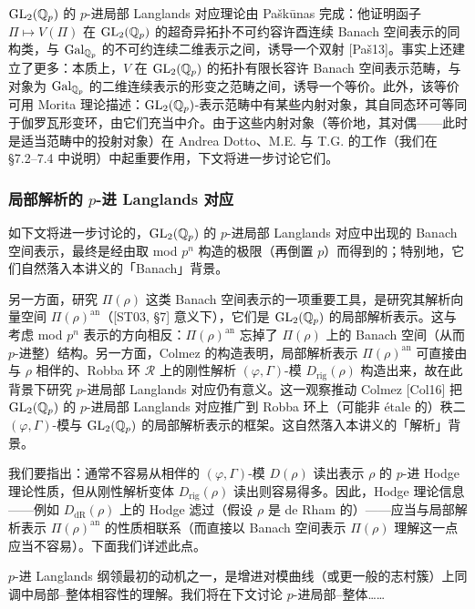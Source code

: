$\mathrm{GL}_2(\mathbb{Q}_p)$ 的 $p$-进局部 Langlands 对应理论由 Paškūnas 完成：他证明函子 $\Pi\mapsto V(\Pi)$ 在 $\mathrm{GL}_2(\mathbb{Q}_p)$ 的超奇异拓扑不可约容许酉连续 Banach 空间表示的同构类，与 $\mathrm{Gal}_{\mathbb{Q}_p}$ 的不可约连续二维表示之间，诱导一个双射 [Paš13]。事实上还建立了更多：本质上，$V$ 在 $\mathrm{GL}_2(\mathbb{Q}_p)$ 的拓扑有限长容许 Banach 空间表示范畴，与对象为 $\mathrm{Gal}_{\mathbb{Q}_p}$ 的二维连续表示的形变之范畴之间，诱导一个等价。此外，该等价可用 Morita 理论描述：$\mathrm{GL}_2(\mathbb{Q}_p)$-表示范畴中有某些内射对象，其自同态环可等同于伽罗瓦形变环，由它们充当中介。由于这些内射对象（等价地，其对偶——此时是适当范畴中的投射对象）在 Andrea Dotto、M.E. 与 T.G. 的工作（我们在 §7.2–7.4 中说明）中起重要作用，下文将进一步讨论它们。

\subsubsection{局部解析的 $p$-进 Langlands 对应}

如下文将进一步讨论的，$\mathrm{GL}_2(\mathbb{Q}_p)$ 的 $p$-进局部 Langlands 对应中出现的 Banach 空间表示，最终是经由取 mod $p^n$ 构造的极限（再倒置 $p$）而得到的；特别地，它们自然落入本讲义的「Banach」背景。

另一方面，研究 $\Pi(\rho)$ 这类 Banach 空间表示的一项重要工具，是研究其解析向量空间 $\Pi(\rho)^{\mathrm{an}}$（[ST03, §7] 意义下），它们是 $\mathrm{GL}_2(\mathbb{Q}_p)$ 的局部解析表示。这与考虑 mod $p^n$ 表示的方向相反：$\Pi(\rho)^{\mathrm{an}}$ 忘掉了 $\Pi(\rho)$ 上的 Banach 空间（从而 $p$-进整）结构。另一方面，Colmez 的构造表明，局部解析表示 $\Pi(\rho)^{\mathrm{an}}$ 可直接由与 $\rho$ 相伴的、Robba 环 $\mathcal{R}$ 上的刚性解析 $(\varphi,\Gamma)$-模 $D_{\mathrm{rig}}(\rho)$ 构造出来，故在此背景下研究 $p$-进局部 Langlands 对应仍有意义。这一观察推动 Colmez [Col16] 把 $\mathrm{GL}_2(\mathbb{Q}_p)$ 的 $p$-进局部 Langlands 对应推广到 Robba 环上（可能非 étale 的）秩二 $(\varphi,\Gamma)$-模与 $\mathrm{GL}_2(\mathbb{Q}_p)$ 的局部解析表示的框架。这自然落入本讲义的「解析」背景。

我们要指出：通常不容易从相伴的 $(\varphi,\Gamma)$-模 $D(\rho)$ 读出表示 $\rho$ 的 $p$-进 Hodge 理论性质，但从刚性解析变体 $D_{\mathrm{rig}}(\rho)$ 读出则容易得多。因此，Hodge 理论信息——例如 $D_{\mathrm{dR}}(\rho)$ 上的 Hodge 滤过（假设 $\rho$ 是 de Rham 的）——应当与局部解析表示 $\Pi(\rho)^{\mathrm{an}}$ 的性质相联系（而直接以 Banach 空间表示 $\Pi(\rho)$ 理解这一点应当不容易）。下面我们详述此点。

$p$-进 Langlands 纲领最初的动机之一，是增进对模曲线（或更一般的志村簇）上同调中局部--整体相容性的理解。我们将在下文讨论 $p$-进局部--整体……
